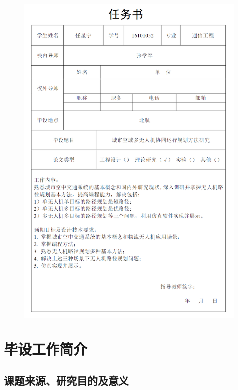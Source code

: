 \documentclass[UTF8,a4paper]{ctexart}
\begin{document}
\begin{figure}[ht]
    \centering
    \includegraphics[scale=1.2]{renwushu.png}
\end{figure}
\thispagestyle{empty}
\newpage

\pagestyle{fancy}		%
\rhead{}
\lhead{}
\cfoot{\thepage}			%
\newpage
\section{毕设工作简介}
\setcounter{page}{1}
\subsection{课题来源、研究目的及意义}
\end{document}
